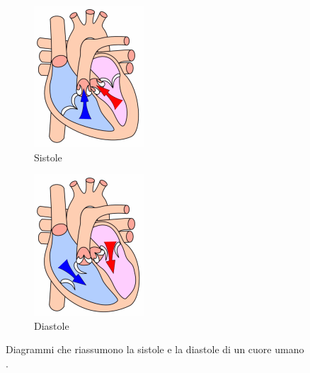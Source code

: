 \begin{figure}[h]
\centering
\begin{subfigure}{0.5\textwidth}
  \centering
  \includegraphics[width=0.5\linewidth]{images/Windkessel/sistole.png}
  \caption{Sistole}
\end{subfigure}%
\begin{subfigure}{0.5\textwidth}
  \centering
  \includegraphics[width=0.5\linewidth]{images/Windkessel/diastole.png}
  \caption{Diastole}
\end{subfigure}
\caption{Diagrammi che riassumono la sistole e la diastole di un cuore umano \cite{wiki:cicloCardiaco}.}
\label{sistoleDiastole}
\end{figure}

\newpage



\newpage

